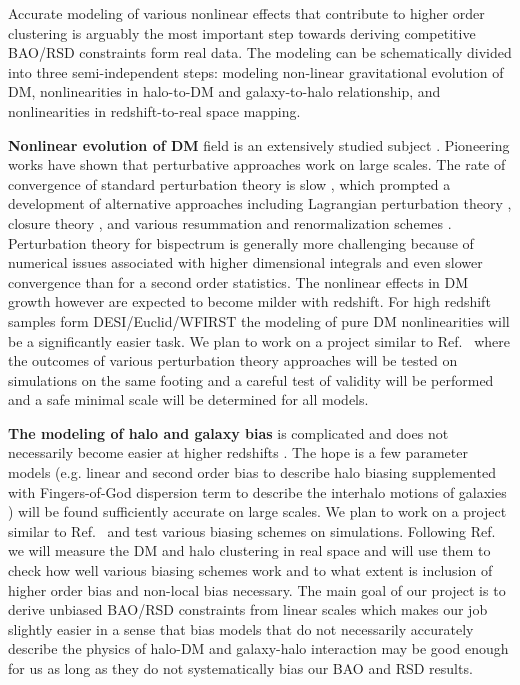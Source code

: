 Accurate modeling of various nonlinear effects that contribute to higher order
clustering is arguably the most important step towards deriving competitive
BAO/RSD constraints form real data. The modeling can be schematically divided
into three semi-independent steps: modeling non-linear gravitational evolution
of DM, nonlinearities in halo-to-DM and galaxy-to-halo relationship, and
nonlinearities in redshift-to-real space mapping.

\textbf{Nonlinear evolution of DM} field is an extensively studied subject
\cite{1981MNRAS.197..931J,1983MNRAS.203..345V,1986ApJ...311....6G,1992PhRvD..46..585M,1994ApJ...431..495J}.
Pioneering works have shown that perturbative approaches work on large scales.
The rate of convergence of standard perturbation theory is slow , which
prompted a development of alternative approaches including Lagrangian
perturbation theory
\cite{1992MNRAS.254..729B,1993MNRAS.264..375B,1994MNRAS.267..811B,1995A&A...296..575B},
closure theory
\cite{2007PhRvD..75d3514M,2008ApJ...674..617T,2008JCAP...10..036P}, and various
resummation and renormalization schemes
\cite{2006PhRvD..73f3519C,2006PhRvD..73f3520C,2008PhRvD..77b3533C}.
Perturbation theory for bispectrum is generally more challenging because of
numerical issues associated with higher dimensional integrals and even slower
convergence than for a second order statistics. The nonlinear effects in DM
growth however are expected to become milder with redshift. For high redshift
samples form DESI/Euclid/WFIRST the modeling of pure DM nonlinearities will be
a significantly easier task. We plan to work on a project similar to
Ref.~\cite{2009PhRvD..80d3531C} where the outcomes of various perturbation
theory approaches will be tested on simulations on the same footing and a
careful test of validity will be performed and a safe minimal scale will be
determined for all models.

\textbf{The modeling of halo and galaxy bias} is complicated and does not
necessarily become easier at higher redshifts \cite{2018PhR...733....1D}. The
hope is a few parameter models (e.g.  linear and second order bias to describe
halo biasing \cite{1993ApJ...413..447F,2012PhRvD..85h3509C,2012PhRvD..86h3540B}
supplemented with Fingers-of-God dispersion term to describe the interhalo
motions of galaxies
\cite{1972MNRAS.156P...1J,2005ApJ...630....1Z,2016MNRAS.455L..77H}) will be
found sufficiently accurate on large scales. We plan to work on a project
similar to Ref.~\cite{2009ApJ...691..569J} and test various biasing schemes on
simulations.  Following Ref.~\cite{2009ApJ...691..569J} we will measure the DM
and halo clustering in real space and will use them to check how well various
biasing schemes work and to what extent is inclusion of higher order bias and
non-local bias necessary. The main goal of our project is to derive unbiased
BAO/RSD constraints from linear scales which makes our job slightly easier in a
sense that bias models that do not necessarily accurately describe the physics
of halo-DM and galaxy-halo interaction may be good enough for us as long as
they do not systematically bias our BAO and RSD results.

